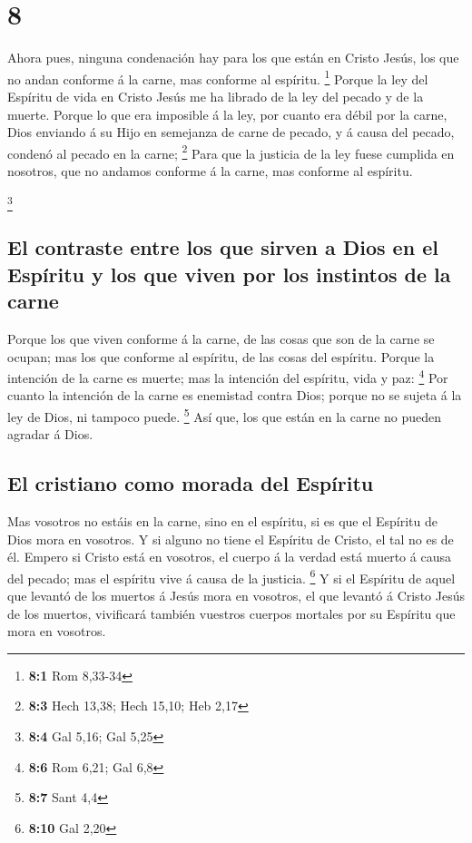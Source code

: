 \hypertarget{section-7}{%
\section{8}\label{section-7}}

 Ahora pues, ninguna condenación hay para los que están en
Cristo Jesús, los que no andan conforme á la carne, mas conforme al
espíritu. \footnote{\textbf{8:1} Rom 8,33-34}  Porque la
ley del Espíritu de vida en Cristo Jesús me ha librado de la ley del
pecado y de la muerte.  Porque lo que era imposible á la
ley, por cuanto era débil por la carne, Dios enviando á su Hijo en
semejanza de carne de pecado, y á causa del pecado, condenó al pecado en
la carne; \footnote{\textbf{8:3} Hech 13,38; Hech 15,10; Heb 2,17}
 Para que la justicia de la ley fuese cumplida en
nosotros, que no andamos conforme á la carne, mas conforme al espíritu.

\footnote{\textbf{8:4} Gal 5,16; Gal 5,25}

\hypertarget{el-contraste-entre-los-que-sirven-a-dios-en-el-espuxedritu-y-los-que-viven-por-los-instintos-de-la-carne}{%
\subsection{El contraste entre los que sirven a Dios en el Espíritu y
los que viven por los instintos de la
carne}\label{el-contraste-entre-los-que-sirven-a-dios-en-el-espuxedritu-y-los-que-viven-por-los-instintos-de-la-carne}}

 Porque los que viven conforme á la carne, de las cosas
que son de la carne se ocupan; mas los que conforme al espíritu, de las
cosas del espíritu.  Porque la intención de la carne es
muerte; mas la intención del espíritu, vida y paz: \footnote{\textbf{8:6}
  Rom 6,21; Gal 6,8}  Por cuanto la intención de la carne
es enemistad contra Dios; porque no se sujeta á la ley de Dios, ni
tampoco puede. \footnote{\textbf{8:7} Sant 4,4}  Así que,
los que están en la carne no pueden agradar á Dios.

\hypertarget{el-cristiano-como-morada-del-espuxedritu}{%
\subsection{El cristiano como morada del
Espíritu}\label{el-cristiano-como-morada-del-espuxedritu}}

 Mas vosotros no estáis en la carne, sino en el espíritu,
si es que el Espíritu de Dios mora en vosotros. Y si alguno no tiene el
Espíritu de Cristo, el tal no es de él.  Empero si Cristo
está en vosotros, el cuerpo á la verdad está muerto á causa del pecado;
mas el espíritu vive á causa de la justicia. \footnote{\textbf{8:10} Gal
  2,20}  Y si el Espíritu de aquel que levantó de los
muertos á Jesús mora en vosotros, el que levantó á Cristo Jesús de los
muertos, vivificará también vuestros cuerpos mortales por su Espíritu
que mora en vosotros.

